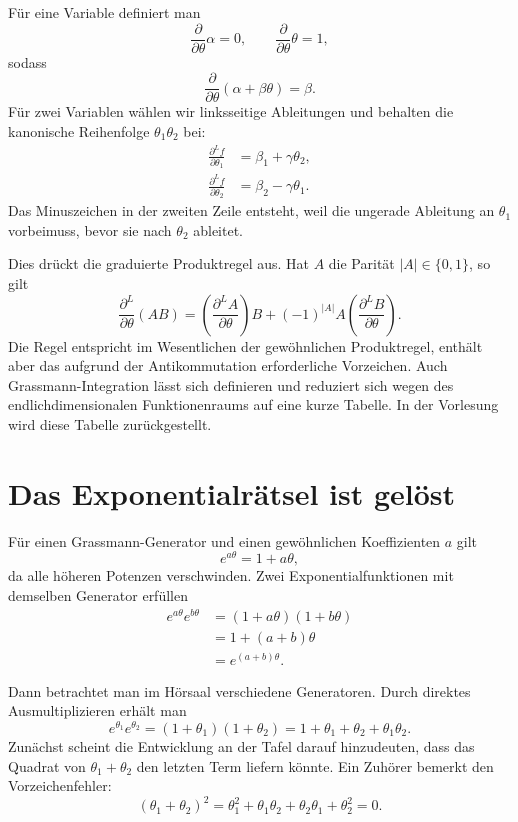 Für eine Variable definiert man
\begin{equation}
\frac{\partial}{\partial\theta}\alpha=0,
\qquad
\frac{\partial}{\partial\theta}\theta=1,
\end{equation}
sodass
\begin{equation}
\frac{\partial}{\partial\theta}
(\alpha+\beta\theta)=\beta.
\end{equation}
Für zwei Variablen wählen wir linksseitige Ableitungen und behalten die kanonische Reihenfolge \(\theta_1\theta_2\) bei:
\begin{align}
\frac{\partial^L f}{\partial\theta_1}
&=\beta_1+\gamma\theta_2,\\
\frac{\partial^L f}{\partial\theta_2}
&=\beta_2-\gamma\theta_1.
\end{align}
Das Minuszeichen in der zweiten Zeile entsteht, weil die ungerade Ableitung an \(\theta_1\) vorbeimuss, bevor sie nach \(\theta_2\) ableitet.

Dies drückt die graduierte Produktregel aus. Hat \(A\) die Parität \(|A|\in\{0,1\}\), so gilt
\begin{equation}
\frac{\partial^L}{\partial\theta}(AB)
=\left(\frac{\partial^L A}{\partial\theta}\right)B
+(-1)^{|A|}A
\left(\frac{\partial^L B}{\partial\theta}\right).
\end{equation}
Die Regel entspricht im Wesentlichen der gewöhnlichen Produktregel, enthält aber das aufgrund der Antikommutation erforderliche Vorzeichen. Auch Grassmann-Integration lässt sich definieren und reduziert sich wegen des endlichdimensionalen Funktionenraums auf eine kurze Tabelle. In der Vorlesung wird diese Tabelle zurückgestellt.

\section{Das Exponentialrätsel ist gelöst}

Für einen Grassmann-Generator und einen gewöhnlichen Koeffizienten \(a\) gilt
\begin{equation}
e^{a\theta}
=1+a\theta,
\end{equation}
da alle höheren Potenzen verschwinden. Zwei Exponentialfunktionen mit demselben Generator erfüllen
\begin{align}
e^{a\theta}e^{b\theta}
&=(1+a\theta)(1+b\theta)\\
&=1+(a+b)\theta\\
&=e^{(a+b)\theta}.
\end{align}

Dann betrachtet man im Hörsaal verschiedene Generatoren. Durch direktes Ausmultiplizieren erhält man
\begin{equation}
e^{\theta_1}e^{\theta_2}
=(1+\theta_1)(1+\theta_2)
=1+\theta_1+\theta_2+\theta_1\theta_2.
\end{equation}
Zunächst scheint die Entwicklung an der Tafel darauf hinzudeuten, dass das Quadrat von \(\theta_1+\theta_2\) den letzten Term liefern könnte. Ein Zuhörer bemerkt den Vorzeichenfehler:
\begin{equation}
(\theta_1+\theta_2)^2
=\theta_1^2+\theta_1\theta_2
 +\theta_2\theta_1+\theta_2^2
=0.
\end{equation}


